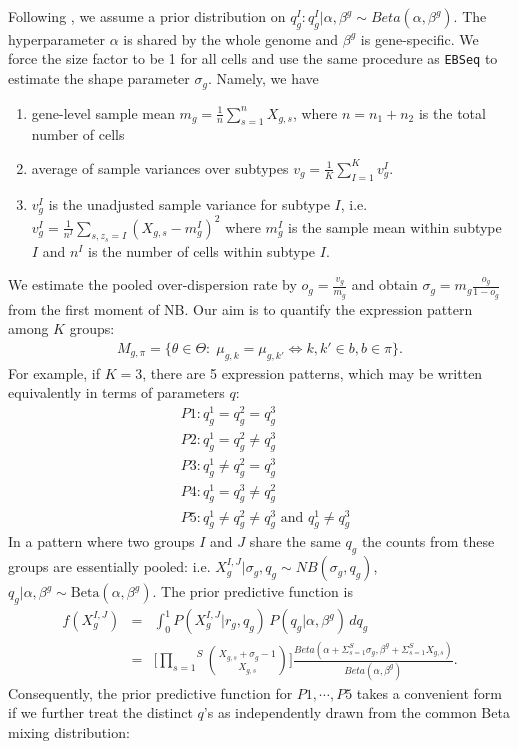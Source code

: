 \documentclass[aoas,preprint]{imsart}
\begin{document}
Following  \cite{ref:Leng}, we assume a prior distribution on $q_g^I : q_g^I | \alpha, \beta^{g} \sim Beta(\alpha, \beta^{g}).$ The hyperparameter $\alpha$ is shared by the whole genome and $\beta^{g}$ is gene-specific.  We force the size factor to be 1 for all cells and use the same procedure as \texttt{EBSeq} to estimate the shape parameter $\sigma_g$. Namely, we have
\begin{enumerate}
\item gene-level sample mean $m_g = \frac{1}{n}\sum_{s = 1}^n X_{g,s}$, where $n = n_1 + n_2$ is the total number of cells \\
\item average of sample variances over subtypes $v_g = \frac{1}{K} \sum_{I = 1}^K v_g^I$.\\
\item $v_g^I$ is the unadjusted sample variance for subtype $I$, i.e. $v_g^I = \frac{1}{n^I}\sum_{s, z_s = I} (X_{g,s} - m_g^I)^2$ where $m_g^I$ is the sample mean within subtype $I$ and $n^I$ is the number of cells within subtype $I$.\\
\end{enumerate}
We estimate the pooled over-dispersion rate by $o_g = \frac{v_g}{m_g}$ and obtain $\sigma_g = m_g \frac{o_g}{1 - o_g}$ from the first moment of NB.  Our aim is to quantify the expression pattern among 
$K$ groups: 
\begin{eqnarray*}
M_{g,\pi} = \{ \theta \in \Theta: \; \mu_{g,k} = \mu_{g,k'} \iff k,k' \in b, b \in \pi \}.
\end{eqnarray*}
For example, if $K = 3$, there are 5 expression patterns, which may be written equivalently 
in terms of parameters $q$:
\begin{align*}
&P1: q_g^1 = q_g^2 = q_g^3\\
&P2: q_g^1 = q_g^2 \neq q_g^3\\
&P3: q_g^1 \neq q_g^2 = q_g^3\\
&P4: q_g^1 = q_g^3 \neq q_g^2\\
&P5: q_g^1 \neq q_g^2 \neq q_g^3 \text{ and } q_g^1 \neq q_g^3
\end{align*}
In a pattern where two groups $I$ and $J$ share the same $q_g$ 
the counts from these groups are essentially pooled: 
 i.e. $X_g^{I, J} | \sigma_{g}, q_g \sim NB(\sigma_{g}, q_g)$, $q_g | \alpha, \beta^{g} \sim \text{Beta}(\alpha, \beta^{g})$. The prior predictive function is
\begin{eqnarray*}
f(X_g^{I,J}) &=& \int_0 ^1 P(X_g^{I,J} | r_{g}, q_g) \, P(q_g | \alpha, \beta^{g}) \, dq_g \\
 &=& \Big[ \overset{S}{\underset{s = 1}{\prod}} {X_{g,s} + \sigma_{g} - 1 \choose X_{g,s}} \Big] \frac{Beta(\alpha + \Sigma_{s = 1}^S \sigma_{g}, \beta^{g} + \Sigma_{s = 1}^S X_{g,s})}{Beta(\alpha, \beta^{g})}.
\end{eqnarray*}
Consequently, the prior predictive function for $P1, \cdots , P5$ takes a convenient form
if we further treat the distinct $q$'s as independently drawn from the  common Beta mixing distribution:
\end{document}
